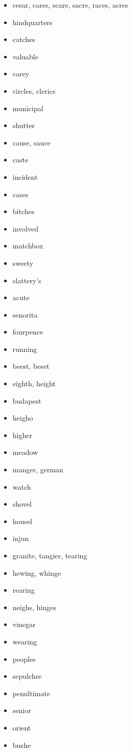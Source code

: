 \documentclass{article}
\begin{document}
\begin{itemize}
    \item cesar, cares, scare, sacre, races, acres
    \item hindquarters
    \item catches
    \item valuable
    \item carey
    \item circles, clerics
    \item municipal
    \item shutter
    \item cause, sauce
    \item caste
    \item incident
    \item cases
    \item bitches
    \item involved
    \item matchbox
    \item sweety
    \item slattery's
    \item acute
    \item senorita
    \item fourpence
    \item running
    \item beest, beset
    \item eighth, height
    \item budapest
    \item heigho
    \item higher
    \item meadow
    \item manger, german
    \item watch
    \item shovel
    \item housel
    \item injun
    \item granite, tangier, tearing
    \item hewing, whinge
    \item rearing
    \item neighs, hinges
    \item vinegar
    \item wearing
    \item peoples
    \item sepulchre
    \item penultimate
    \item senior
    \item orient
    \item bushe

\end{itemize}
\end{document}
